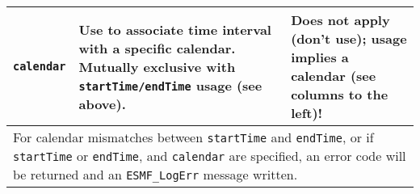 \begin{center}
\begin{table}
\begin{tabular}{|p{1.15in}|p{1.15in}|p{1.15in}|p{1.15in}|p{1.15in}|p{1.15in}|}
{\bf {\tt calendar}} &
  \multicolumn{4}{l}{Use to associate time interval with a specific calendar.  Mutually exclusive with {\tt startTime/endTime} usage (see above).} &

  Does not apply (don't use); usage implies a calendar (see columns to the left)! \\
\hline

  \multicolumn{6}{l}{For calendar mismatches between {\tt startTime} and {\tt endTime}, or if {\tt startTime} or {\tt endTime}, and {\tt calendar} are specified, an error code will be returned and an {\tt ESMF\_LogErr} message written.} \\
\hline

\end{tabular}
\end{table}
\end{center}
